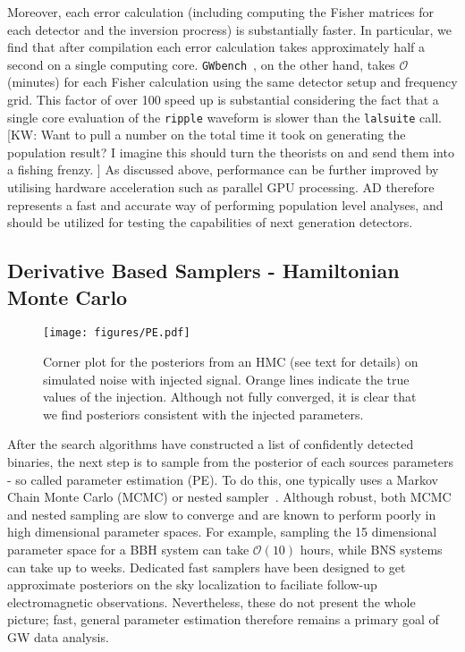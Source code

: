 \documentclass[twocolumn]{aastex631}
\newcommand{\ripple}{\texttt{ripple}\xspace}
\newcommand{\lalsuite}{\texttt{lalsuite}\xspace}
\newcommand{\kw}[1]{{\color{rb4}[KW: #1 ]}}
\begin{document}
Moreover, each error calculation (including computing the Fisher matrices for each detector and the inversion procress) is substantially faster.
In particular, we find that after compilation each error calculation takes approximately half a second on a single computing core.
\texttt{GWbench}~\citep{Borhanian:2020ypi}, on the other hand, takes $\mathcal{O}$(minutes) for each Fisher calculation using the same detector setup and frequency grid.
This factor of over 100 speed up is substantial considering the fact that a single core evaluation of the \ripple waveform is slower than the \lalsuite call.
\kw{Want to pull a number on the total time it took on generating the population result? I imagine this should turn the theorists on and send them into a fishing frenzy.}
As discussed above, performance can be further improved by utilising hardware acceleration such as parallel GPU processing.
AD therefore represents a fast and accurate way of performing population level analyses, and should be utilized for testing the capabilities of next generation detectors.

\subsection{Derivative Based Samplers - Hamiltonian Monte Carlo}
\label{subsec:hmc}

\begin{figure*}[t]
    \centering
    \texttt{[image: figures/PE.pdf]}
    \caption{
        Corner plot for the posteriors from an HMC (see text for details) on simulated noise with injected signal. 
        Orange lines indicate the true values of the injection. 
        Although not fully converged, it is clear that we find posteriors consistent with the injected parameters. 
    }
    \label{fig:corner}
\end{figure*}

After the search algorithms have constructed a list of confidently detected binaries, the next step is to sample from the posterior of each sources parameters - so called parameter estimation (PE).
To do this, one typically uses a Markov Chain Monte Carlo (MCMC) or nested sampler~\citep{multinest, dynesty}.
Although robust, both MCMC and nested sampling are slow to converge and are known to perform poorly in high dimensional parameter spaces.
For example, sampling the 15 dimensional parameter space for a BBH system can take $\mathcal{O}(10)$ hours, while BNS systems can take up to weeks.
Dedicated fast samplers have been designed to get approximate posteriors on the sky localization to faciliate follow-up electromagnetic observations.
Nevertheless, these do not present the whole picture; fast, general parameter estimation therefore remains a primary goal of GW data analysis.
\end{document}
